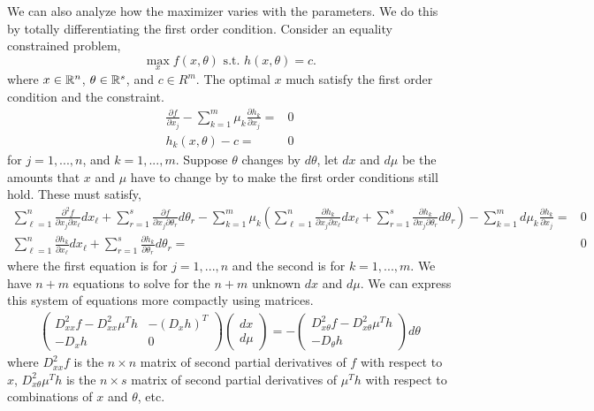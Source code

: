 We can also analyze how the maximizer varies with the parameters. We
do this by totally differentiating the first order condition. Consider
an equality constrained problem,
\[ \max_x f(x,\theta) \text{ s.t. } h(x,\theta) = c. \] 
where $x \in \mathbb{R}^n$, $\theta \in \mathbb{R}^s$, and $c \in R^m$.
The optimal $x$ much satisfy the first order condition and the
constraint.
\begin{align*}
  \frac{\partial f}{\partial x_j} - \sum_{k=1}^m \mu_k \frac{\partial
    h_k}{\partial x_j} = & 0 \\
  h_k(x,\theta) - c = & 0 
\end{align*}
for $j = 1,..., n$, and $k=1,...,m$. Suppose $\theta$ changes by
$d\theta$, let $dx$ and $d\mu$ be the amounts that $x$ and $\mu$
have to change by to make the first order conditions still hold. These
must satisfy,
\begin{align*}
  \sum_{\ell=1}^n \frac{\partial^2 f}{\partial x_j \partial x_\ell}
  dx_\ell + \sum_{r=1}^s \frac{\partial f}{\partial x_j \partial
    \theta_r} d\theta_r - \sum_{k=1}^m \mu_k \left( \sum_{\ell=1}^n
    \frac{\partial h_k}{\partial x_j \partial x_\ell} dx_\ell +
    \sum_{r=1}^s \frac{\partial h_k}{\partial x_j \partial \theta_r}
    d\theta_r \right) - \sum_{k=1}^m d\mu_k \frac{\partial
    h_k}{\partial x_j} = & 0  \\
  \sum_{\ell = 1}^n \frac{\partial h_k}{\partial x_\ell} dx_\ell +
  \sum_{r=1}^s \frac{\partial h_k}{\partial \theta_r} d\theta_r = & 0
\end{align*}
where the first equation is for $j = 1,..., n$ and the second is for
$k = 1, ..., m$. We have $n+m$ equations to solve for the $n + m$
unknown $dx$ and $d\mu$. We can express this system of equations more
compactly using matrices.
\begin{align*}
  \begin{pmatrix} D^2_{xx} f - D^2_{xx} \mu^T h  & -(D_x h)^T \\
    -D_x h & 0 
  \end{pmatrix} 
  \begin{pmatrix}
    dx \\ d\mu
  \end{pmatrix} 
  =  -\begin{pmatrix} D^2_{x\theta} f - D^2_{x\theta} \mu^T h \\
    -D_\theta h \end{pmatrix} d\theta
\end{align*}
where $D^2_{xx} f$ is the $n \times n$ matrix of second partial
derivatives of $f$ with respect to $x$, $D^2_{x\theta} \mu^T h$ is the
$n \times s$ matrix of second partial derivatives of $\mu^Th$ with
respect to combinations of $x$ and $\theta$, etc. 

